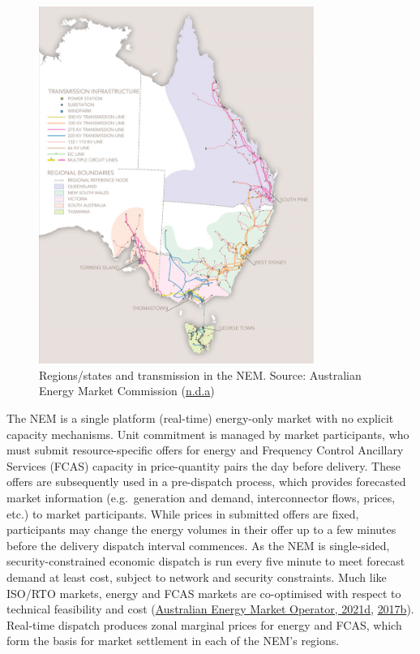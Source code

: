 \documentclass[12pt,a4paper,]{report}
\begin{document}
\begin{figure}
\hypertarget{fig:NEM}{%
\centering
\includegraphics[width=0.8\textwidth,height=\textheight]{source/figures/NEM.png}
\caption[The National Electricity Market (NEM)]{Regions/states and
transmission in the NEM. Source: Australian Energy Market Commission
(\protect\hyperlink{ref-australianenergymarketcommissionNationalElectricityMarket}{n.d.a})}\label{fig:NEM}
}
\end{figure}

The NEM is a single platform (real-time) energy-only market with no
explicit capacity mechanisms. Unit commitment is managed by market
participants, who must submit resource-specific offers for energy and
Frequency Control Ancillary Services (FCAS) capacity in price-quantity
pairs the day before delivery. These offers are subsequently used in a
pre-dispatch process, which provides forecasted market information
(e.g.~generation and demand, interconnector flows, prices, etc.) to
market participants. While prices in submitted offers are fixed,
participants may change the energy volumes in their offer up to a few
minutes before the delivery dispatch interval commences. As the NEM is
single-sided, security-constrained economic dispatch is run every five
minute to meet forecast demand at least cost, subject to network and
security constraints. Much like ISO/RTO markets, energy and FCAS markets
are co-optimised with respect to technical feasibility and cost
(\protect\hyperlink{ref-australianenergymarketoperatorDispatchStandardOperating2019}{Australian
Energy Market Operator, 2021d},
\protect\hyperlink{ref-australianenergymarketoperatorFCASModelNEMDE2017}{2017b}).
Real-time dispatch produces zonal marginal prices for energy and FCAS,
which form the basis for market settlement in each of the NEM's regions.
\end{document}
